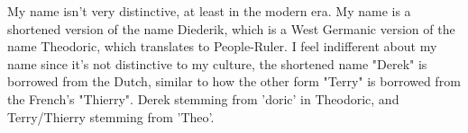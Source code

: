 \documentclass[12pt]{article}
\begin{document}
My name isn't very distinctive, at least in the modern era. My name is a shortened version of the name Diederik, which is a West Germanic version of the name Theodoric, which translates to People-Ruler. I feel indifferent about my name since it's not distinctive to my culture, the shortened name "Derek" is borrowed from the Dutch, similar to how the other form "Terry" is borrowed from the French's "Thierry". Derek stemming from 'doric' in Theodoric, and Terry/Thierry stemming from 'Theo'.
\end{document}
